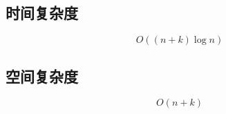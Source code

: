 \documentclass[UTF8]{article}
\begin{document}
\subsection{时间复杂度}

$$
O((n+k) \log n)
$$

\subsection{空间复杂度}

$$
O(n+k)
$$

\end{document}
